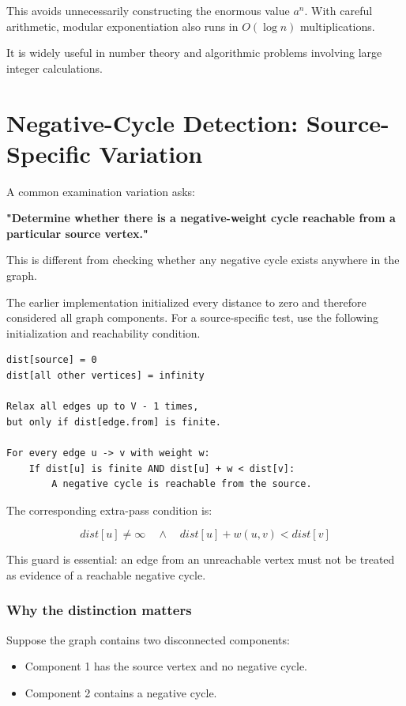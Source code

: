 This avoids unnecessarily constructing the enormous value $a^n$. With careful arithmetic, modular exponentiation also runs in $O(\log n)$ multiplications.

It is widely useful in number theory and algorithmic problems involving large integer calculations.


\newpage
\section{Negative-Cycle Detection: Source-Specific Variation}


A common examination variation asks:

\textbf{"Determine whether there is a negative-weight cycle reachable from a particular source vertex."}

This is different from checking whether any negative cycle exists anywhere in the graph.

The earlier implementation initialized every distance to zero and therefore considered all graph components. For a source-specific test, use the following initialization and reachability condition.

\begin{lstlisting}[style=pseudocode]
dist[source] = 0
dist[all other vertices] = infinity

Relax all edges up to V - 1 times,
but only if dist[edge.from] is finite.

For every edge u -> v with weight w:
    If dist[u] is finite AND dist[u] + w < dist[v]:
        A negative cycle is reachable from the source.
\end{lstlisting}

The corresponding extra-pass condition is:


\[
\boxed{ dist[u]\neq\infty \quad\land\quad dist[u]+w(u,v)<dist[v] }
\]


This guard is essential: an edge from an unreachable vertex must not be treated as evidence of a reachable negative cycle.

\subsubsection{Why the distinction matters}

Suppose the graph contains two disconnected components:

\begin{itemize}
    \item Component 1 has the source vertex and no negative cycle.
    \item Component 2 contains a negative cycle.
\end{itemize}

